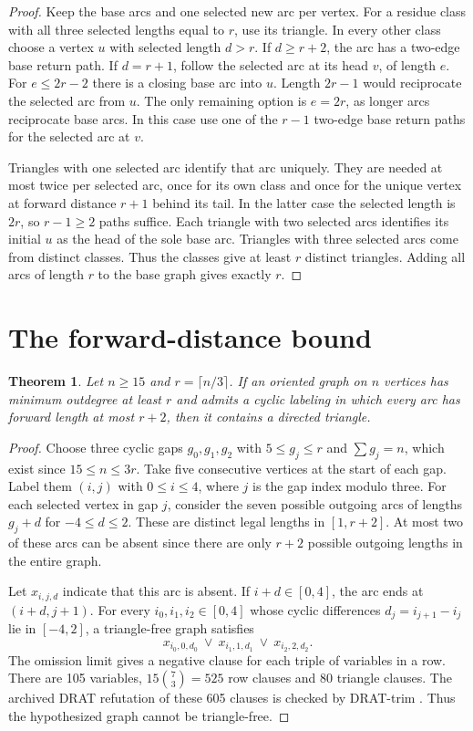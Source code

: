 \documentclass[10pt]{article}
\newtheorem{theorem}{Theorem}
\begin{document}
\begin{proof}
Keep the base arcs and one selected new arc per vertex. For a residue
class with all three selected lengths equal to \(r\), use its triangle.
In every other class choose a vertex \(u\) with selected length \(d>r\).
If \(d\ge r+2\), the arc has a two-edge base return path. If \(d=r+1\),
follow the selected arc at its head \(v\), of length \(e\). For
\(e\le2r-2\) there is a closing base arc into \(u\). Length \(2r-1\)
would reciprocate the selected arc from \(u\). The only remaining
option is \(e=2r\), as longer arcs reciprocate base arcs. In this
case use one of the \(r-1\) two-edge base return paths for the selected
arc at \(v\).

Triangles with one selected arc identify that arc uniquely. They are
needed at most twice per selected arc, once for its own class and once
for the unique vertex at forward distance \(r+1\) behind its tail.
In the latter case the selected length is \(2r\), so \(r-1\ge2\)
paths suffice. Each triangle with two selected arcs identifies its
initial \(u\) as the head of the sole base arc. Triangles with three
selected arcs come from distinct classes. Thus the classes give at
least \(r\) distinct triangles. Adding all arcs of length \(r\) to
the base graph gives exactly \(r\).
\end{proof}

\section{The forward-distance bound}

\begin{theorem}
Let \(n\ge15\) and \(r=\lceil n/3\rceil\). If an oriented graph on
\(n\) vertices has minimum outdegree at least \(r\) and admits a cyclic
labeling in which every arc has forward length at most \(r+2\), then
it contains a directed triangle.
\end{theorem}

\begin{proof}
Choose three cyclic gaps \(g_0,g_1,g_2\) with \(5\le g_j\le r\) and
\(\sum g_j=n\), which exist since \(15\le n\le3r\). Take five consecutive
vertices at the start of each gap. Label them \((i,j)\) with
\(0\le i\le4\), where \(j\) is the gap index modulo three. For each
selected vertex in gap \(j\), consider the seven possible outgoing
arcs of lengths \(g_j+d\) for \(-4\le d\le2\). These are distinct legal
lengths in \([1,r+2]\). At most two of these arcs can be absent since
there are only \(r+2\) possible outgoing lengths in the entire graph.

Let \(x_{i,j,d}\) indicate that this arc is absent. If \(i+d\in[0,4]\),
the arc ends at \((i+d,j+1)\). For every \(i_0,i_1,i_2\in[0,4]\) whose
cyclic differences \(d_j=i_{j+1}-i_j\) lie in \([-4,2]\), a triangle-free
graph satisfies
\[
    x_{i_0,0,d_0}\ \lor\ x_{i_1,1,d_1}\ \lor\ x_{i_2,2,d_2}.
\]
The omission limit gives a negative clause for each triple of variables
in a row. There are 105 variables, \(15\binom73=525\) row clauses and
80 triangle clauses. The archived DRAT refutation of these 605 clauses
is checked by DRAT-trim \cite{drat}. Thus the hypothesized graph
cannot be triangle-free.
\end{proof}
\end{document}
